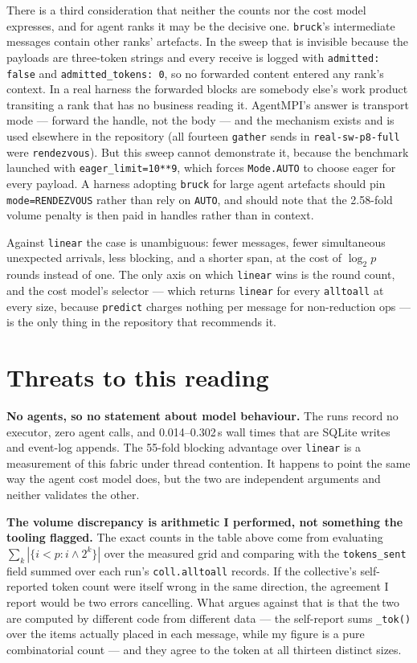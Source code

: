 \documentclass[11pt]{article}
\begin{document}
There is a third consideration that neither the counts nor the cost model expresses, and for
agent ranks it may be the decisive one. \texttt{bruck}'s intermediate messages contain other
ranks' artefacts. In the sweep that is invisible because the payloads are three-token strings
and every receive is logged with \texttt{admitted: false} and \texttt{admitted\_tokens: 0}, so
no forwarded content entered any rank's context. In a real harness the forwarded blocks are
somebody else's work product transiting a rank that has no business reading it. AgentMPI's
answer is transport mode --- forward the handle, not the body --- and the mechanism exists and
is used elsewhere in the repository (all fourteen \texttt{gather} sends in
\texttt{real-sw-p8-full} were \texttt{rendezvous}). But this sweep cannot demonstrate it,
because the benchmark launched with \texttt{eager\_limit=10**9}, which forces
\texttt{Mode.AUTO} to choose eager for every payload. A harness adopting \texttt{bruck} for
large agent artefacts should pin \texttt{mode=RENDEZVOUS} rather than rely on \texttt{AUTO},
and should note that the 2.58-fold volume penalty is then paid in handles rather than in
context.

Against \texttt{linear} the case is unambiguous: fewer messages, fewer simultaneous unexpected
arrivals, less blocking, and a shorter span, at the cost of $\log_2 p$ rounds instead of one.
The only axis on which \texttt{linear} wins is the round count, and the cost model's selector
--- which returns \texttt{linear} for every \texttt{alltoall} at every size, because
\texttt{predict} charges nothing per message for non-reduction ops --- is the only thing in the
repository that recommends it.

\section{Threats to this reading}

\textbf{No agents, so no statement about model behaviour.} The runs record no executor, zero
agent calls, and 0.014--0.302\,s wall times that are SQLite writes and event-log appends. The
55-fold blocking advantage over \texttt{linear} is a measurement of this fabric under thread
contention. It happens to point the same way the agent cost model does, but the two are
independent arguments and neither validates the other.

\textbf{The volume discrepancy is arithmetic I performed, not something the tooling flagged.}
The exact counts in the table above come from evaluating
$\sum_k |\{i < p : i \wedge 2^k\}|$ over the measured grid and comparing with the
\texttt{tokens\_sent} field summed over each run's \texttt{coll.alltoall} records. If the
collective's self-reported token count were itself wrong in the same direction, the agreement I
report would be two errors cancelling. What argues against that is that the two are computed by
different code from different data --- the self-report sums \texttt{\_tok()} over the items
actually placed in each message, while my figure is a pure combinatorial count --- and they
agree to the token at all thirteen distinct sizes.
\end{document}
